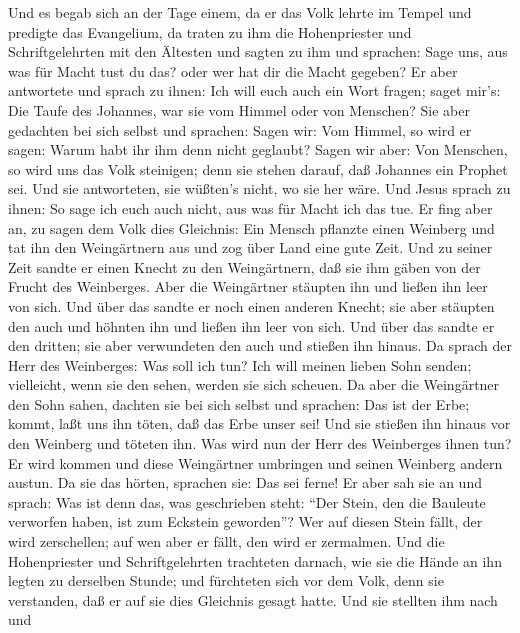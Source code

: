  Und es begab sich an der Tage einem, da er das Volk lehrte
im Tempel und predigte das Evangelium, da traten zu ihm die
Hohenpriester und Schriftgelehrten mit den Ältesten  und
sagten zu ihm und sprachen: Sage uns, aus was für Macht tust du das?
oder wer hat dir die Macht gegeben?  Er aber antwortete und
sprach zu ihnen: Ich will euch auch ein Wort fragen; saget mir's:
 Die Taufe des Johannes, war sie vom Himmel oder von
Menschen?  Sie aber gedachten bei sich selbst und sprachen:
Sagen wir: Vom Himmel, so wird er sagen: Warum habt ihr ihm denn nicht
geglaubt?  Sagen wir aber: Von Menschen, so wird uns das
Volk steinigen; denn sie stehen darauf, daß Johannes ein Prophet sei.
 Und sie antworteten, sie wüßten's nicht, wo sie her wäre.
 Und Jesus sprach zu ihnen: So sage ich euch auch nicht, aus
was für Macht ich das tue.  Er fing aber an, zu sagen dem
Volk dies Gleichnis: Ein Mensch pflanzte einen Weinberg und tat ihn den
Weingärtnern aus und zog über Land eine gute Zeit.  Und zu
seiner Zeit sandte er einen Knecht zu den Weingärtnern, daß sie ihm
gäben von der Frucht des Weinberges. Aber die Weingärtner stäupten ihn
und ließen ihn leer von sich.  Und über das sandte er noch
einen anderen Knecht; sie aber stäupten den auch und höhnten ihn und
ließen ihn leer von sich.  Und über das sandte er den
dritten; sie aber verwundeten den auch und stießen ihn hinaus.
 Da sprach der Herr des Weinberges: Was soll ich tun? Ich
will meinen lieben Sohn senden; vielleicht, wenn sie den sehen, werden
sie sich scheuen.  Da aber die Weingärtner den Sohn sahen,
dachten sie bei sich selbst und sprachen: Das ist der Erbe; kommt, laßt
uns ihn töten, daß das Erbe unser sei!  Und sie stießen ihn
hinaus vor den Weinberg und töteten ihn. Was wird nun der Herr des
Weinberges ihnen tun?  Er wird kommen und diese Weingärtner
umbringen und seinen Weinberg andern austun. Da sie das hörten, sprachen
sie: Das sei ferne!  Er aber sah sie an und sprach: Was ist
denn das, was geschrieben steht: ``Der Stein, den die Bauleute verworfen
haben, ist zum Eckstein geworden''?  Wer auf diesen Stein
fällt, der wird zerschellen; auf wen aber er fällt, den wird er
zermalmen.  Und die Hohenpriester und Schriftgelehrten
trachteten darnach, wie sie die Hände an ihn legten zu derselben Stunde;
und fürchteten sich vor dem Volk, denn sie verstanden, daß er auf sie
dies Gleichnis gesagt hatte.  Und sie stellten ihm nach und
